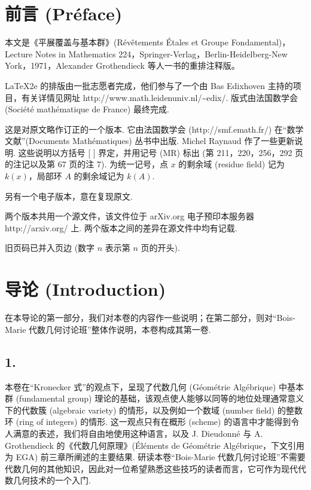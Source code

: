 
\chapter*{前言 (Préface)}

本文是《平展覆盖与基本群》(Révêtements Étales et Groupe Fondamental)，Lecture Notes in Mathematics 224，Springer-Verlag，Berlin-Heidelberg-New York，1971，Alexander Grothendieck 等人一书的重排注释版。

LaTeX2e 的排版由一批志愿者完成，他们参与了一个由 Bas Edixhoven 主持的项目，有关详情见网址 http://www.math.leidenuniv.nl/\textasciitilde edix/. 版式由法国数学会 (Société mathématique de France) 最终完成.

这是对原文略作订正的一个版本. 它由法国数学会 (http://smf.emath.fr/) 在``数学文献''(Documents Mathématiques) 丛书中出版. Michel Raynaud 作了一些更新说明. 这些说明以方括号 [ ] 界定，并用记号 (MR) 标出 (第 211，220，256，292 页的注记以及第 67 页的注 7). 为统一记号，点 $x$ 的剩余域 (residue field) 记为 $k(x)$，局部环 $A$ 的剩余域记为 $k(A)$.

另有一个电子版本，意在复现原文.

两个版本共用一个源文件，该文件位于 arXiv.org 电子预印本服务器 http://arxiv.org/ 上. 两个版本之间的差异在源文件中均有记载.

旧页码已并入页边 (数字 $n$ 表示第 $n$ 页的开头).

\cleardoublepage

\chapter*{导论 (Introduction)}

在本导论的第一部分，我们对本卷的内容作一些说明；在第二部分，则对``Bois-Marie 代数几何讨论班''整体作说明，本卷构成其第一卷.

\section*{1.}

本卷在``Kronecker 式''的观点下，呈现了代数几何 (Géométrie Algébrique) 中基本群 (fundamental group) 理论的基础，该观点使人能够以同等的地位处理通常意义下的代数簇 (algebraic variety) 的情形，以及例如一个数域 (number field) 的整数环 (ring of integers) 的情形. 这一观点只有在概形 (scheme) 的语言中才能得到令人满意的表述，我们将自由地使用这种语言，以及 J. Dieudonné 与 A. Grothendieck 的《代数几何原理》(Éléments de Géométrie Algébrique，下文引用为 EGA) 前三章所阐述的主要结果. 研读本卷``Bois-Marie 代数几何讨论班''不需要代数几何的其他知识，因此对一位希望熟悉这些技巧的读者而言，它可作为现代代数几何技术的一个入门.

